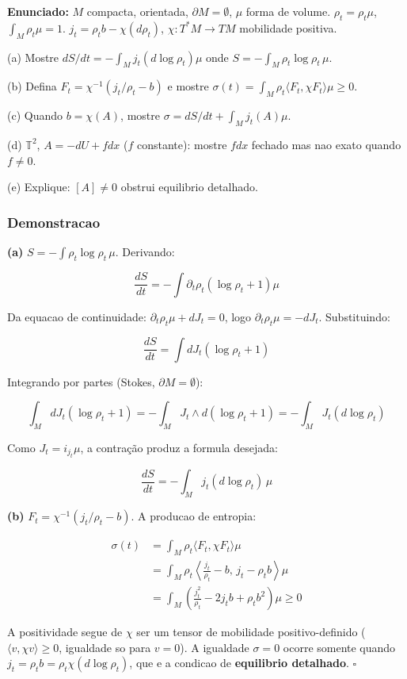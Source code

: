 \documentclass[12pt,a4paper,oneside]{article}
\begin{document}
\textbf{Enunciado:} $M$ compacta, orientada, $\partial M = \emptyset$, $\mu$
forma de volume. $\rho_t = \rho_t\mu$, $\int_M \rho_t\mu = 1$.
$j_t = \rho_t b - \chi(d\rho_t)$, $\chi: T^*M \to TM$ mobilidade positiva.

(a) Mostre $dS/dt = -\int_M j_t(d\log\rho_t)\mu$ onde
$S = -\int_M \rho_t\log\rho_t\,\mu$.

(b) Defina $F_t = \chi^{-1}(j_t/\rho_t - b)$ e mostre $\sigma(t) =
\int_M \rho_t\langle F_t, \chi F_t\rangle\mu \geq 0$.

(c) Quando $b = \chi(A)$, mostre $\sigma = dS/dt + \int_M j_t(A)\mu$.

(d) $\mathbb{T}^2$, $A = -dU + fdx$ ($f$ constante): mostre $fdx$ fechado
mas nao exato quando $f \neq 0$.

(e) Explique: $[A] \neq 0$ obstrui equilibrio detalhado.

\subsubsection*{Demonstracao}

\textbf{(a)} $S = -\int \rho_t\log\rho_t\,\mu$. Derivando:

$$\frac{dS}{dt} = -\int \partial_t\rho_t(\log\rho_t + 1)\mu$$

Da equacao de continuidade: $\partial_t\rho_t\mu + dJ_t = 0$, logo
$\partial_t\rho_t\mu = -dJ_t$. Substituindo:

$$\frac{dS}{dt} = \int dJ_t(\log\rho_t + 1)$$

Integrando por partes (Stokes, $\partial M = \emptyset$):

$$\int_M dJ_t(\log\rho_t+1) = -\int_M J_t \wedge d(\log\rho_t+1) =
-\int_M J_t(d\log\rho_t)$$

Como $J_t = i_{j_t}\mu$, a contração produz a formula desejada:

$$\boxed{\frac{dS}{dt} = -\int_M j_t(d\log\rho_t)\,\mu}$$

\textbf{(b)} $F_t = \chi^{-1}(j_t/\rho_t - b)$. A producao de entropia:

\begin{align*}
\sigma(t) &= \int_M \rho_t \langle F_t, \chi F_t \rangle \mu \\
&= \int_M \rho_t \left\langle \frac{j_t}{\rho_t} - b,\,
j_t - \rho_t b \right\rangle \mu \\
&= \int_M \left(\frac{j_t^2}{\rho_t} - 2j_t b + \rho_t b^2\right)\mu
\geq 0
\end{align*}

A positividade segue de $\chi$ ser um tensor de mobilidade positivo-definido
($\langle v, \chi v\rangle \geq 0$, igualdade so para $v=0$). A igualdade
$\sigma = 0$ ocorre somente quando $j_t = \rho_t b = \rho_t\chi(d\log\rho_t)$,
que e a condicao de \textbf{equilibrio detalhado}. $\square$
\end{document}
